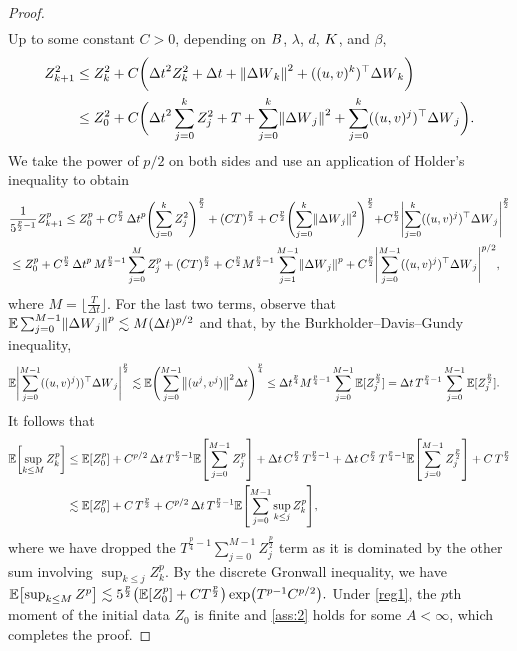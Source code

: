 \documentclass[11pt, twoside]{report}
\begin{document}
\begin{proof}
\begin{align*}
\end{align*}
Up to some  constant $C>0$, depending on $B$, $\lambda$, $d$, $K$, and $\beta$,
\begin{align*}
     Z_{k+1}^2&\leq Z_k^2 + C\biggl(\deltat^2 Z_k^2 + \deltat + \norm{\deltaw_k}^2 + ((u,v)^k)^\top \deltaw_k\biggr)\\
     &\leq   Z_0^2 + C\biggl(\deltat^2 \sum_{j=0}^k Z_j^2 +T + \sum_{j=0}^k\norm{\deltaw_j}^2 + \sum_{j=0}^k ((u,v)^j)^\top \deltaw_j\biggr).
\end{align*}
We take the power of $p/2$ on both sides and use an application of Holder's inequality to obtain
\begin{align*}
  &\frac{1}{5^{\frac{p}{2}-1}} Z_{k+1}^p \leq 
  Z_0^p + C^{\frac{p}2}\,\deltat^p\Biggl( \sum_{j=0}^k Z_j^2\Biggr)
  ^{\frac{p}2} 
  + (CT)^{\frac{p}2}  + C^{\frac{p}2}\Biggl(\sum_{j=0}^k\norm{\deltaw_j}^2\Biggl)^{\frac{p}2} + C^{\frac{p}2}\Biggl|\sum_{j=0}^k ((u,v)^j)^\top \deltaw_j\Biggr|^{\frac{p}2}\\
  &\leq Z_0^p + C^{\frac{p}2}  \,\deltat^p\, M^{\frac{p}{2}-1} \sum_{j=0}^M Z_j^{p} + (CT)^{\frac{p}{2}} + C^{\frac{p}{2}} M^{\frac{p}{2}-1} \sum_{j=1}^{M-1} \norm{\deltaw_j}^p + C^{\frac{p}{2}} \Biggl|\sum_{j=0}^{M-1} ((u,v)^j)^\top{\deltaw_j}\Biggr|^{p/2},
\end{align*}
where $M = \lfloor \frac{T}{\Delta t} \rfloor$. For the last two terms, observe that
  $\EE\sum_{j=0}^{M-1} \norm{\deltaw_j}^p \lesssim M (\deltat)^{p/2}$ and that, by the Burkholder--Davis--Gundy inequality, \begin{align*}
   \EE \Biggl|\sum_{j=0}^{M-1} ((u,v)^j))^\top {\deltaw_j}\Biggr|^{\frac{p}2} &\lesssim \EE \Biggl(\sum_{j=0}^{M-1} \norm{(u^j,v^j)}^2 \deltat\Biggr)^{\frac{p}4}
    \leq \deltat^{\frac{p}4} M^{\frac{p}{4}-1}\sum_{j=0}^{M-1} \EE[Z_j^{\frac{p}2}]
    = \deltat\, T^{\frac{p}{4}-1} \sum_{j=0}^{M-1} \EE[Z_j^{\frac{p}2}].
    \end{align*}
It follows that
\begin{align*}
    \EE\bp{\sup_{k\leq M} Z_k^p}
&\leq \mean{Z_0^p} + C^{p/2}  \,\deltat \,T^{\frac{p}{2}-1} \mean{\sum_{j=0}^{M-1} Z_j^p} + \deltat\, C^{\frac{p}{2}}\, T^{\frac{p}{2}-1} +\deltat\, C^{ \frac{p}{2}} \,T^{\frac{p}{4}-1}\mean{\sum_{j=0}^{M-1} Z_j^{\frac{p}{2}}} + C\,T^{\frac{p}{2}}\\
&\lesssim \mean{Z_0^p} +C\,T^{\frac{p}{2}}+ C^{p/2}  \,\deltat \,T^{\frac{p}{2}-1} \mean{\sum_{j=0}^{M-1} \sup_{k\leq j} Z_k^p}, 
\end{align*}
where we have dropped the $T^{\frac{p}{4}-1}\sum_{j=0}^{M-1} Z_j^{\frac{p}{2}}$ term as it is dominated by the other sum involving $\sup_{k\leq j}Z_k^p$. By the discrete Gronwall inequality, we have
$
 \EE\bp{\sup_{k\leq M} Z^p} \lesssim  5^{\frac{p}2}  \pp{\mathbb{E}\bp{Z_0^p} + C T^{\frac{p}{2}}} \exp\bigl(T^{p-1} C^{p/2} \bigr).
$
Under \ref{reg1}, the $p$th moment of the initial data $Z_0$ is finite and \ref{ass:2} holds for some $A<\infty$, which completes the proof.
\end{proof}
\end{document}
